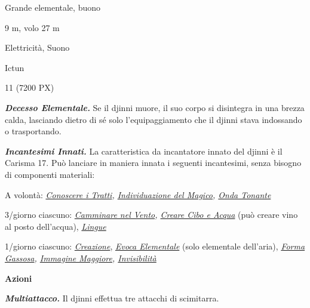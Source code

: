 \begin{multicols}{2}
{
\begin{description}[noitemsep, topsep=0pt, parsep=0pt, partopsep=0pt, itemsep=1pt, leftmargin=2.35cm,  labelwidth=2.2cm, itemindent=0cm, listparindent=0pt] %
\setlength{\baselineskip}{10pt}
\item[\textbf{Taglia/Tipo}] Grande elementale, buono
\item[\textbf{Caratt.}] 
\item[\textbf{Punti Ferita}] 
\item[\textbf{Movimento}] 9 m, volo 27 m
\item[\textbf{Tiri Salvez.}] 
\item[\textbf{Imm. Danni}] Elettricità, Suono
\item[\textbf{Sensi}] 
\item[\textbf{Linguaggi}] Ictun
\item[\textbf{Sfida}] 11 (7200 PX)
\end{description}
\smallskip

\emph{\textbf{Decesso Elementale.}} Se il djinni muore, il suo corpo si disintegra in una brezza calda, lasciando dietro di sé solo l'equipaggiamento che il djinni stava indossando o trasportando.

\emph{\textbf{Incantesimi Innati.}} La caratteristica da incantatore innato del djinni è il Carisma 17. Può lanciare in maniera innata i seguenti incantesimi, senza bisogno di componenti materiali:

A volontà: \emph{\hyperlink{Conoscere i Tratti}{Conoscere i Tratti}, \hyperlink{Individuazione del Magico}{Individuazione del Magico}, \hyperlink{Onda Tonante}{Onda Tonante}}

3/giorno ciascuno: \emph{\hyperlink{Camminare nel Vento}{Camminare nel Vento}, \hyperlink{Creare Cibo e Acqua}{Creare Cibo e Acqua}} (può creare vino al posto dell'acqua), \emph{\hyperlink{Lingue}{Lingue}}

1/giorno ciascuno: \emph{\hyperlink{Creazione}{Creazione}}, \emph{\hyperlink{Evoca Elementale}{Evoca Elementale}} (solo elementale dell'aria), \emph{\hyperlink{Forma Gassosa}{Forma Gassosa}, \hyperlink{Immagine Maggiore}{Immagine Maggiore}, \hyperlink{Invisibilità}{Invisibilità}}

\textbf{Azioni}

\emph{\textbf{Multiattacco.}} Il djinni effettua tre attacchi di scimitarra.

}
\end{multicols}
